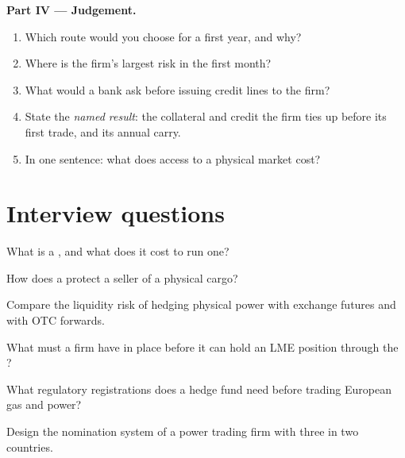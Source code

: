 \begin{problem}
\medskip\noindent\textbf{Part IV --- Judgement.}
\begin{enumerate}[resume]
\item Which route would you choose for a first year, and why?
\item Where is the firm's largest risk in the first month?
\item What would a bank ask before issuing credit lines to the firm?
\item State the \emph{named result}: the collateral and credit the firm ties up before its first trade, and its
annual carry.
\item In one sentence: what does access to a physical market cost?
\end{enumerate}
\end{problem}

\section{Interview questions}

\begin{interviewq}\label{iq:m3:getting-access-commodities-and-power:1}
What is a , and what does it cost to run one?
\end{interviewq}

\begin{interviewq}\label{iq:m3:getting-access-commodities-and-power:2}
How does a  protect a seller of a physical cargo?
\end{interviewq}

\begin{interviewq}\label{iq:m3:getting-access-commodities-and-power:3}
Compare the liquidity risk of hedging physical power with exchange futures and with OTC forwards.
\end{interviewq}

\begin{interviewq}\label{iq:m3:getting-access-commodities-and-power:4}
What must a firm have in place before it can hold an LME position through the ?
\end{interviewq}

\begin{interviewq}\label{iq:m3:getting-access-commodities-and-power:5}
What regulatory registrations does a hedge fund need before trading European gas and power?
\end{interviewq}

\begin{interviewq}\label{iq:m3:getting-access-commodities-and-power:6}
Design the nomination system of a power trading firm with three  in two countries.
\end{interviewq}
